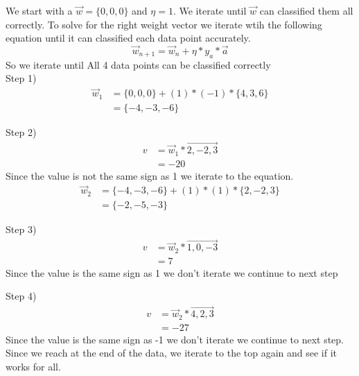 \documentclass[12pt,english]{article}
\begin{document}
We start with a $\vec{w} = \{ 0,0,0\}$ and $\eta = 1$. We iterate until $\vec{w}$ can classified them all correctly. To solve for the  right weight vector we iterate wtih the following equation until it can classified each data point accurately.
\begin{equation*}
\vec{w}_{n+1} = \vec{w}_n + \eta * y_a * \vec{a}
\end{equation*}
So we iterate until All 4 data points can be classified correctly\\
Step 1)
\begin{equation}\tag{1}
\begin{split}
\vec{w}_{1} &= \{0,0,0\}+ (1) * (-1) * \{4,3,6 \}\\
&= \{-4,-3,-6 \}
\end{split}
\end{equation}

Step 2)
\begin{equation*}
\begin{split}
v&= \vec{w}_1* \vec{2,-2,3}\\
&= -20
\end{split}
\end{equation*}
Since the value is not the same sign as 1 we iterate to the equation.
\begin{equation}\tag{2}
\begin{split}
\vec{w}_{2} &= \{-4,-3,-6\}+ (1) * (1) * \{2,-2,3 \}\\
&= \{-2,-5,-3 \}
\end{split}
\end{equation}

Step 3)
\begin{equation*}
\begin{split}
v&= \vec{w}_2 * \vec{1,0,-3}\\
&= 7
\end{split}
\end{equation*}
Since the value is the same sign as 1 we don't iterate we continue to next step\par

Step 4)
\begin{equation*}
\begin{split}
v&= \vec{w}_2 * \vec{4,2,3}\\
&= -27
\end{split}
\end{equation*}
Since the value is the same sign as -1 we don't iterate we continue to next step. Since we reach at the end of the data, we iterate to the top again and see if it works for all.\\
\end{document}

